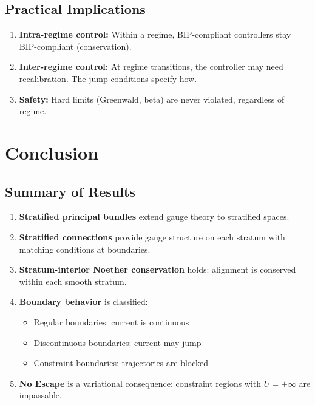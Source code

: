 \documentclass[11pt,a4paper]{article}
\begin{document}
\subsection{Practical Implications}

\begin{enumerate}
    \item \textbf{Intra-regime control:} Within a regime, BIP-compliant controllers stay BIP-compliant (conservation).
    \item \textbf{Inter-regime control:} At regime transitions, the controller may need recalibration. The jump conditions specify how.
    \item \textbf{Safety:} Hard limits (Greenwald, beta) are never violated, regardless of regime.
\end{enumerate}

\section{Conclusion}

\subsection{Summary of Results}

\begin{enumerate}
    \item \textbf{Stratified principal bundles} extend gauge theory to stratified spaces.

    \item \textbf{Stratified connections} provide gauge structure on each stratum with matching conditions at boundaries.

    \item \textbf{Stratum-interior Noether conservation} holds: alignment is conserved within each smooth stratum.

    \item \textbf{Boundary behavior} is classified:
    \begin{itemize}
        \item Regular boundaries: current is continuous
        \item Discontinuous boundaries: current may jump
        \item Constraint boundaries: trajectories are blocked
    \end{itemize}

    \item \textbf{No Escape} is a variational consequence: constraint regions with $U = +\infty$ are impassable.
\end{enumerate}
\end{document}
